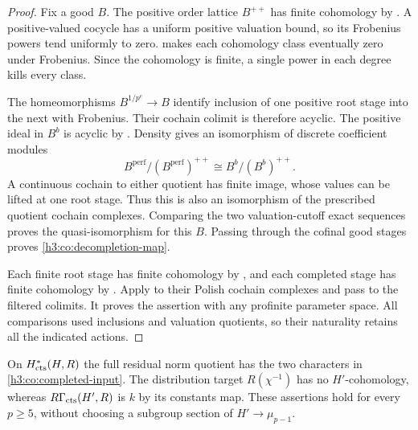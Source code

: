 \begin{proof}
Fix a good $B$.  The positive order lattice $B^{++}$ has finite
cohomology by .  A positive-valued
cocycle has a uniform positive valuation bound, so its Frobenius powers
tend uniformly to zero.   makes each cohomology class
eventually zero under Frobenius.  Since the cohomology is finite, a
single power in each degree kills every class.

The homeomorphisms $B^{1/p^e}\to B$ identify inclusion of one positive
root stage into the next with Frobenius.  Their cochain colimit is
therefore acyclic.  The positive ideal in $B^b$ is acyclic by
.  Density gives an isomorphism of discrete
coefficient modules
\[
 B^{\mathrm{perf}}/(B^{\mathrm{perf}})^{++}
 \cong B^b/(B^b)^{++}.
\]
A continuous cochain to either quotient has finite image, whose values
can be lifted at one root stage.  Thus this is also an isomorphism of
the prescribed quotient cochain complexes.  Comparing the two
valuation-cutoff exact sequences proves the quasi-isomorphism for this
$B$.  Passing through the cofinal good stages proves
\eqref{h3:co:decompletion-map}.

Each finite root stage has finite cohomology by
, and each completed stage has finite
cohomology by .  Apply
 to their Polish cochain complexes and pass to the
filtered colimits.  It proves the assertion with any profinite
parameter space.  All comparisons used inclusions and valuation
quotients, so their naturality retains all the indicated actions.
\end{proof}

\begin{lemma}\label{h3:lem:full-norm-weights}
On $H^*_{\mathrm{cts}}(H,R)$ the full residual norm quotient has the two
characters in \eqref{h3:co:completed-input}.  The distribution target
$R(\chi^{-1})$ has no $H'$-cohomology, whereas
$R\Gamma_{\mathrm{cts}}(H',R)$ is $k$ by its constants map.
These assertions hold for every $p\geq5$, without choosing a subgroup
section of $H'\to\mu_{p-1}$.
\end{lemma}

